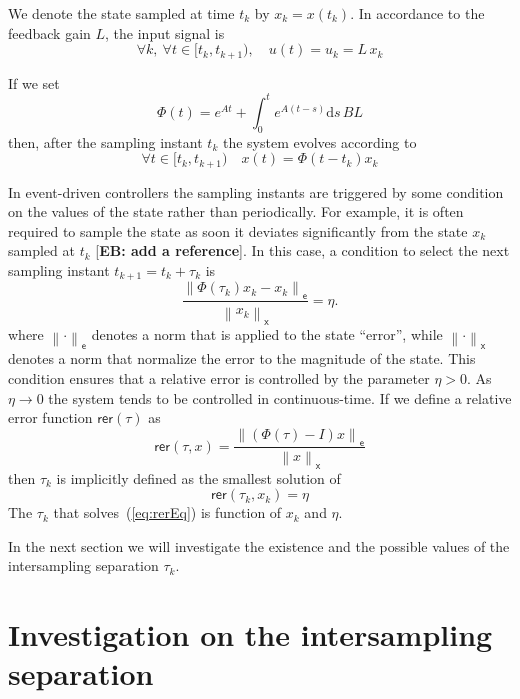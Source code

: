 \documentclass[12pt,draftcls,onecolumn]{IEEEtran} %
\newcommand{\ud}{\mathrm{d}}
\newcommand{\nE}[1]{\left\|#1\right\|_{\mathsf e}}
\newcommand{\nX}[1]{\left\|#1\right\|_{\mathsf x}}
\begin{document}
We denote the state sampled at time $t_k$ by $x_k=x(t_k)$. In
accordance to the feedback gain $L$, the input signal is
\begin{equation}
  \label{eq:input}
  \forall k,\ \forall t\in[t_k,t_{k+1}),\quad
  u(t) = u_k=L\,x_k
\end{equation}

If we set
\begin{equation}
  \label{eq:Phi}
  \Phi(t) = e^{At}+\int_0^te^{A(t-s)}\ud s\,B L
\end{equation}
then, after the sampling instant $t_k$ the system evolves according to
\begin{equation}
  \label{eq:stateEvolve}
  \forall t\in[t_k,t_{k+1})\quad
  x(t) = \Phi(t-t_k)x_k
\end{equation}

In event-driven controllers the sampling instants are triggered by
some condition on the values of the state rather than periodically.
For example, it is often required to sample the state as soon it
deviates significantly from the state $x_k$ sampled at $t_k$
[\textbf{EB: add a reference}]. In this case, a condition to select
the next sampling instant $t_{k+1}=t_k+\tau_k$ is
\begin{equation}
  \label{eq:execRuleNorm}
  \frac{\nE{\Phi(\tau_k)x_k-x_k}}{\nX{x_k}} =\eta.
\end{equation}
where $\nE{\cdot}$ denotes a norm that is applied to the state
``error'', while $\nX{\cdot}$ denotes a norm that normalize the error
to the magnitude of the state.  This condition ensures that a relative
error is controlled by the parameter $\eta>0$. As $\eta\to 0$ the
system tends to be controlled in continuous-time. If we define a
relative error function $\mathsf{rer}(\tau)$ as
\begin{equation}
  \label{eq:rer}
  \mathsf{rer}(\tau,x) = \frac{\nE{(\Phi(\tau)-I)x}}{\nX{x}}
\end{equation}
then $\tau_k$ is implicitly defined as the smallest solution of
\begin{equation}
  \label{eq:rerEq}
  \mathsf{rer}(\tau_k,x_k)=\eta
\end{equation}
The $\tau_k$ that solves~(\ref{eq:rerEq}) is function of $x_k$ and
$\eta$.  

In the next section we will investigate the existence and the possible
values of the intersampling separation $\tau_k$.


\section{Investigation on the intersampling separation}
\label{sec:tauK}
\end{document}

